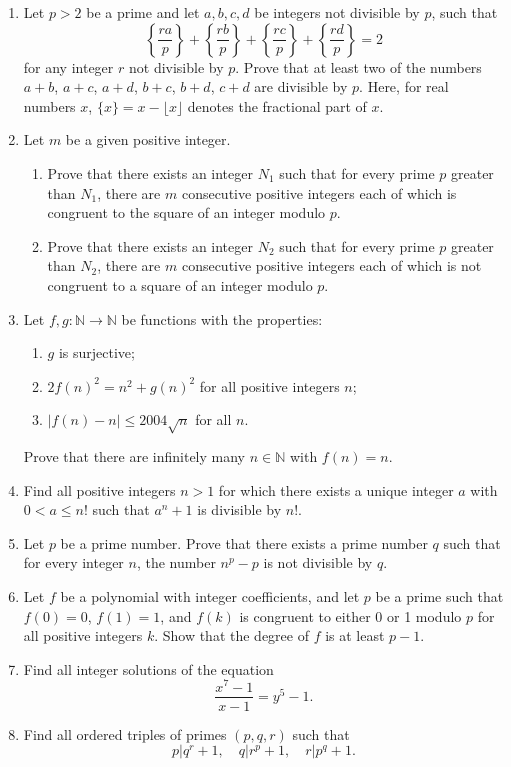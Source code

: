 \documentclass[12pt]{article}
\begin{document}
\begin{enumerate}
\item Let $p>2$ be a prime and let $a,b,c,d$ be integers not divisible
  by $p$, such
  that \[\left\{\frac{ra}p\right\}+\left\{\frac{rb}p\right\}+\left\{\frac{rc}p\right\}+\left\{\frac{rd}p\right\}
  = 2\] for any integer $r$ not divisible by $p$.  Prove that at least
  two of the numbers $a+b$, $a+c$, $a+d$, $b+c$, $b+d$, $c+d$ are
  divisible by $p$.  Here, for real numbers $x$, $\{x\} = x-\lfloor
  x\rfloor$ denotes the fractional part of $x$.
\item Let $m$ be a given positive integer. \begin{enumerate} \item
  Prove that there exists an integer $N_1$ such that for every prime $p$
  greater than $N_1$, there are $m$ consecutive positive integers each
  of which is congruent to the square of an integer modulo $p$.
\item Prove that there exists an integer $N_2$ such that for every
  prime $p$ greater than $N_2$, there are $m$ consecutive positive
  integers each of which is not congruent to a square of an integer
  modulo $p$.
\end{enumerate}
\item Let $f,g:\mathbb N\rightarrow\mathbb N$ be functions with the
  properties: \begin{enumerate} \item $g$ is surjective; \item
    $2f(n)^2=n^2+g(n)^2$ for all positive integers $n$; \item
    $|f(n)-n|\leq 2004\sqrt n$ for all $n$. \end{enumerate} Prove that
  there are infinitely many $n\in\mathbb N$ with $f(n)=n$.
\item Find all positive integers $n>1$ for which there exists a unique
  integer $a$ with $0<a\leq n!$ such that $a^n+1$ is divisible by
  $n!$.
\item Let $p$ be a prime number.  Prove that there exists a prime
  number $q$ such that for every integer $n$, the number $n^p-p$ is
  not divisible by $q$.
\item Let $f$ be a polynomial with integer coefficients, and let $p$
  be a prime such that $f(0)=0$, $f(1)=1$, and $f(k)$ is congruent to
  either 0 or 1 modulo $p$ for all positive integers $k$.  Show that
  the degree of $f$ is at least $p-1$.
\item Find all integer solutions of the equation \[\frac{x^7-1}{x-1}=y^5-1.\]
\item Find all ordered triples of primes $(p,q,r)$ such
  that \[p|q^r+1,\quad q|r^p+1,\quad r|p^q+1.\]

\end{enumerate}
\end{document}
